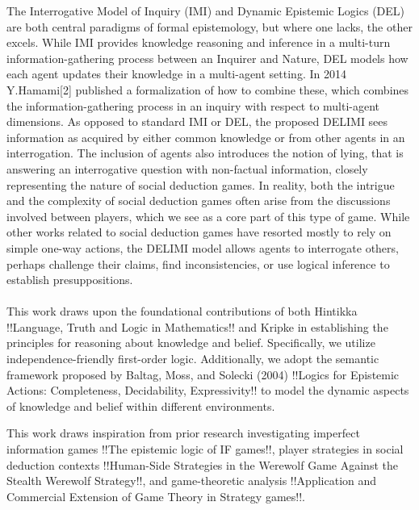 The Interrogative Model of Inquiry (IMI) and Dynamic Epistemic Logics (DEL) are
both central paradigms of formal epistemology, but where one lacks, the other
excels. While IMI provides knowledge reasoning and inference in a multi-turn
information-gathering process between an Inquirer and Nature, DEL models how
each agent updates their knowledge in a multi-agent setting. In 2014
Y.Hamami[2] published a formalization of how to combine these, which combines
the information-gathering process in an inquiry with respect to multi-agent
dimensions. As opposed to standard IMI or DEL, the proposed DELIMI sees
information as acquired by either common knowledge or from other agents in an
interrogation. The inclusion of agents also introduces the notion of lying,
that is answering an interrogative question with non-factual information,
closely representing the nature of social deduction games. In reality, both the
intrigue and the complexity of social deduction games often arise from the
discussions involved between players, which we see as a core part of this type
of game. While other works related to social deduction games have resorted
mostly to rely on simple one-way actions, the DELIMI model allows agents to
interrogate others, perhaps challenge their claims, find inconsistencies, or
use logical inference to establish presuppositions. \\ \\ This work draws upon
the foundational contributions of both Hintikka !!Language, Truth and Logic in
Mathematics!! and Kripke in establishing the principles for reasoning about
knowledge and belief. Specifically, we utilize independence-friendly
first-order logic. Additionally, we adopt the semantic framework proposed by
Baltag, Moss, and Solecki (2004) !!Logics for Epistemic Actions: Completeness,
Decidability, Expressivity!! to model the dynamic aspects of knowledge and
belief within different environments.

This work draws inspiration from prior research investigating imperfect
information games !!The epistemic logic of IF games!!, player strategies in
social deduction contexts !!Human-Side Strategies in the Werewolf Game Against
the Stealth Werewolf Strategy!!, and game-theoretic analysis !!Application and
Commercial Extension of Game Theory in Strategy games!!.